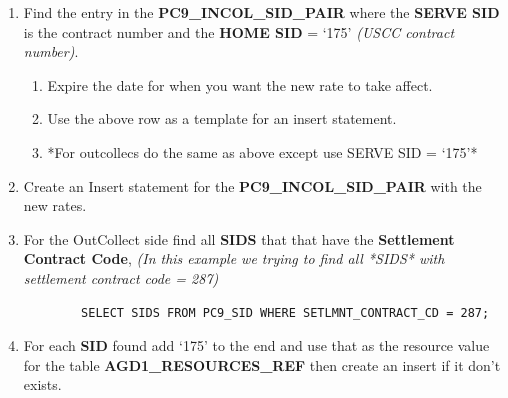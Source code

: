 \documentclass[12pt,twoside]{article}
\begin{document}
\begin{enumerate}
\item Find the entry in the \textbf{PC9\_INCOL\_SID\_PAIR} where the \textbf{SERVE SID} is the contract number and the \textbf{HOME SID} = `175' \emph{(USCC contract number)}.
\begin{enumerate}
\item Expire the date for when you want the new rate to take affect.
\item Use the above row as a template for an insert statement.
\item *For outcollecs do the same as above except use SERVE SID = `175'*
\end{enumerate}
\item Create an Insert statement for the  \textbf{PC9\_INCOL\_SID\_PAIR} with the new rates.
\item For the OutCollect side find all \textbf{SIDS} that that have the \textbf{Settlement Contract Code}, \emph{(In this example we trying to find all *SIDS* with settlement contract code = 287)}
\begin{verbatim}
        SELECT SIDS FROM PC9_SID WHERE SETLMNT_CONTRACT_CD = 287;
\end{verbatim}
\item For each \textbf{SID} found add `175' to the end and use that as the resource value for the table \textbf{AGD1\_RESOURCES\_REF} then create an insert if it don't exists.
\end{enumerate}
   \footnotesize
\end{document}
